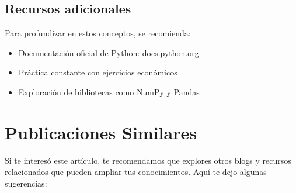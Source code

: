 \documentclass[
  doc,
  floatsintext,
  longtable,
  a4paper,
  nolmodern,
  notxfonts,
  notimes,
  12pt,
  colorlinks=true,linkcolor=blue,citecolor=blue,urlcolor=blue]{apa7}
\providecommand{\tightlist}{%
  \setlength{\itemsep}{0pt}\setlength{\parskip}{0pt}}
\begin{document}
\subsection{Recursos adicionales}\label{recursos-adicionales}

Para profundizar en estos conceptos, se recomienda:

\begin{itemize}
\tightlist
\item
  Documentación oficial de Python: docs.python.org
\item
  Práctica constante con ejercicios económicos
\item
  Exploración de bibliotecas como NumPy y Pandas
\end{itemize}

\section{Publicaciones Similares}\label{publicaciones-similares}

Si te interesó este artículo, te recomendamos que explores otros blogs y
recursos relacionados que pueden ampliar tus conocimientos. Aquí te dejo
algunas sugerencias:
\end{document}
